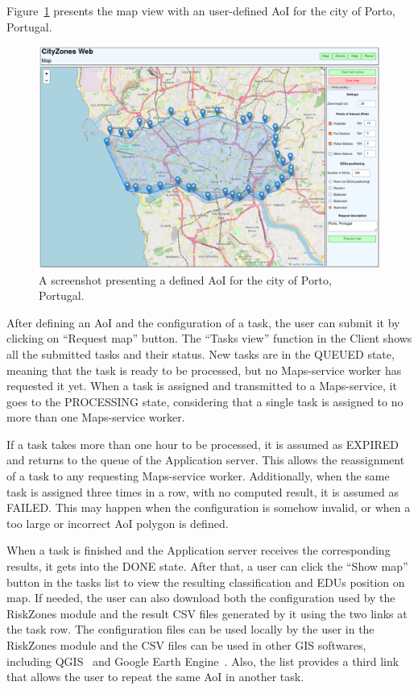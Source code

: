 \begin{refsection}
Figure~\ref{fig:web_map_aoi} presents the map view with an user-defined AoI for the city of Porto, Portugal.

\begin{figure}[htb]
  \centering
  \includegraphics[width=.8\textwidth]{Chapters/4-CityZones/img/cityzones_map_aoi.png}
  \caption{A screenshot presenting a defined AoI for the city of Porto, Portugal.}\label{fig:web_map_aoi}
\end{figure}

After defining an AoI and the configuration of a task, the user can submit it by clicking on ``Request map'' button.  The ``Tasks view'' function in the Client shows all the submitted tasks and their status. New tasks are in the QUEUED state, meaning that the task is ready to be processed, but no Maps-service worker has requested it yet. When a task is assigned and transmitted to a Maps-service, it goes to the PROCESSING state, considering that a single task is assigned to no more than one Maps-service worker.

If a task takes more than one hour to be processed, it is assumed as EXPIRED and returns to the queue of the Application server. This allows the reassignment of a task to any requesting Maps-service worker. Additionally, when the same task is assigned three times in a row, with no computed result, it is assumed as FAILED. This may happen when the configuration is somehow invalid, or when a too large or incorrect AoI polygon is defined.

When a task is finished and the Application server receives the corresponding results, it gets into the DONE state. After that, a user can click the ``Show map'' button in the tasks list to view the resulting classification and EDUs position on map. If needed, the user can also download both the configuration used by the RiskZones module and the result CSV files generated by it using the two links at the task row. The configuration files can be used locally by the user in the RiskZones module and the CSV files can be used in other GIS softwares, including QGIS~\cite{qgis} and Google Earth Engine~\cite{earth}. Also, the list provides a third link that allows the user to repeat the same AoI in another task.


\end{refsection}
